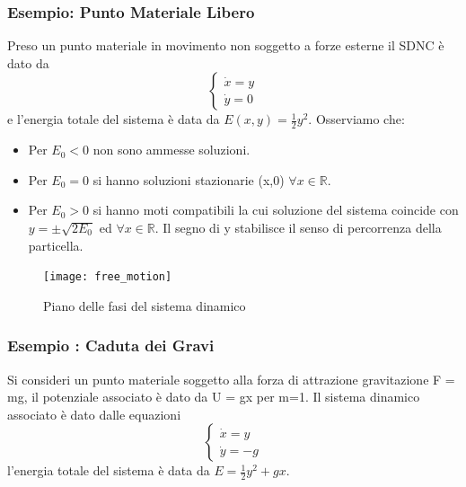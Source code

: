 \subsubsection{Esempio: Punto Materiale Libero}

Preso un punto materiale in movimento non soggetto a forze esterne il SDNC \`{e} dato da \
\begin{equation*}
	\left \{ \begin{array}{l}
		\dot{x} = y\\
		\dot{y} = 0
	\end{array} \right.
\end{equation*}
e l'energia totale del sistema \`{e} data da $E(x,y) = \frac{1}{2}y^2$. Osserviamo che:
\begin{itemize}
	\item Per $E_0 < 0 $ non sono ammesse soluzioni.
	\item Per $E_0 = 0 $ si hanno soluzioni stazionarie (x,0) $\forall x \in \mathbb{R}$.
	\item Per $E_0 > 0$ si hanno moti compatibili la cui soluzione del sistema coincide con $y = \pm\sqrt{2E_0}$ ed $\forall x \in \mathbb{R}$. Il segno di y stabilisce il senso di percorrenza della particella.
\end{itemize}

 
\begin{figure}[!ht]
\vspace{0.1in}
\texttt{[image: free\_motion]}	
\centering
\vspace{0.1in}
\caption{Piano delle fasi del sistema dinamico}
\end{figure}

\newpage

\subsubsection{Esempio : Caduta dei Gravi}

Si consideri un punto materiale soggetto alla forza di attrazione gravitazione F = mg, il potenziale associato \`{e} dato da U = gx per m=1. Il sistema dinamico associato \`{e} dato dalle equazioni 
\begin{equation*}
	\left \{ \begin{array}{l}
		\dot{x} = y \\
		\dot{y} = -g 
	\end{array} \right.
\end{equation*}
l'energia totale del sistema \`{e} data da $E = \frac{1}{2} y^2 + gx$.

